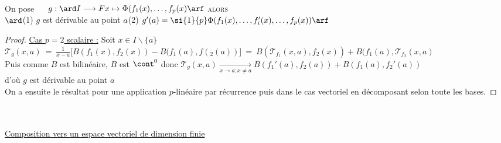 {{    \\ On pose $~~~~g:\ard I\longrightarrow F \\ x\mapsto \Phi (f_1(x) , \dots , f_p (x) \arf$ \textsc{alors} \\$\ard ${\tiny (1)} $g$ est 
    dérivable au point $a \\ ${\tiny (2)} $g'(a) = \si{1}{p} \Phi (f_1(x) , \dots , f_i'(x) ,\dots , f_p(x)) \arf $}
    \begin{proof}
    \underline{Cas $p=2$ scalaire :} Soit $x\in I\backslash \{ a\}$ \vspace*{0.2cm}\\$ \mathcal{T}_g(x,a) ~=~ \frac{1}{x-a} \big[
    B(f_1(x),f_2(x)) - B(f_1(a),f(_2(a)) \big] ~=~ B(\mathcal{T}_{f_1} (x,a),f_2(x)) + B(f_1(a),\mathcal{T}_{f_2} (x,a) $\vspace*{0.2cm}
    \\ Puis comme $B$ est bilinéaire, $B$ est $\cont^0$ donc $\mathcal{T}_g(x,a) \underset{x\rightarrow a ; x\neq a}{\longrightarrow} 
    B(f_1'(a),f_2(a)) + B(f_1(a) , f_2'(a))$ \\d'où $g$ est dérivable au point $a$\vspace*{0.2cm}\\
    On a ensuite le résultat pour une application $p$-linéaire par récurrence puis dans le cas vectoriel en décomposant selon toute les bases. 
    \end{proof}
    ${}$ \\ 
    \vspace*{0.5cm} \\ \underline{Composition vers un espace vectoriel de dimension finie} \\
}
